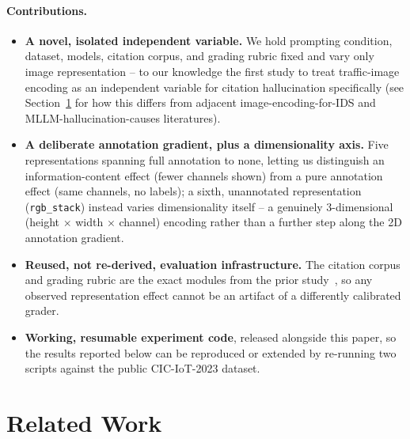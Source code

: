 \documentclass[11pt]{article}
\begin{document}
\paragraph{Contributions.}
\begin{itemize}
\item \textbf{A novel, isolated independent variable.} We hold prompting condition, dataset,
models, citation corpus, and grading rubric fixed and vary only image representation -- to our
knowledge the first study to treat traffic-image encoding as an independent variable for citation
hallucination specifically (see Section~\ref{sec:related} for how this differs from adjacent
image-encoding-for-IDS and MLLM-hallucination-causes literatures).
\item \textbf{A deliberate annotation gradient, plus a dimensionality axis.} Five representations
spanning full annotation to none, letting us distinguish an information-content effect (fewer
channels shown) from a pure annotation effect (same channels, no labels); a sixth, unannotated
representation (\texttt{rgb\_stack}) instead varies dimensionality itself -- a genuinely
3-dimensional (height $\times$ width $\times$ channel) encoding rather than a further step along the
2D annotation gradient.
\item \textbf{Reused, not re-derived, evaluation infrastructure.} The citation corpus and grading
rubric are the exact modules from the prior study~\cite{groundingcitation2026}, so any observed
representation effect cannot be an artifact of a differently calibrated grader.
\item \textbf{Working, resumable experiment code}, released alongside this paper, so the results
reported below can be reproduced or extended by re-running two scripts against the public
CIC-IoT-2023 dataset.
\end{itemize}

\section{Related Work}
\label{sec:related}
\end{document}
